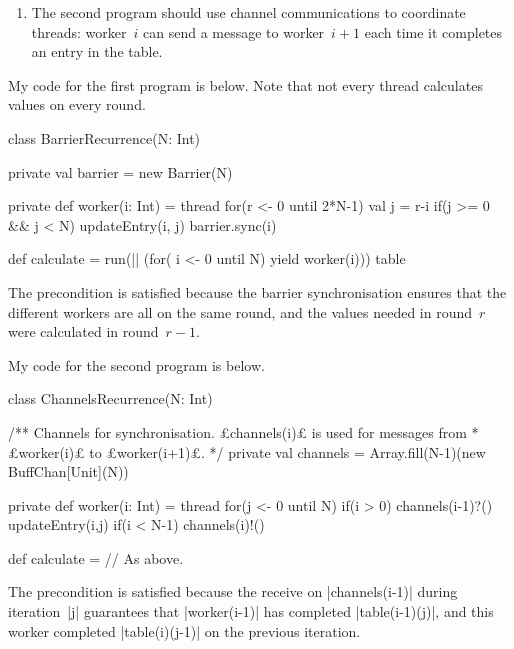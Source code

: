 \begin{question}
\begin{enumerate}
\item The second program should use channel communications to coordinate
  threads: worker~$i$ can send a message to worker~$i+1$ each time it
  completes an entry in the table.
\end{enumerate}
\end{question}


\begin{answerI}
My code for the first program is below.  Note that not every thread calculates
values on every round.
%
\begin{scala}
class BarrierRecurrence(N: Int){
  private val barrier = new Barrier(N)

  private def worker(i: Int) = thread{
    for(r <- 0 until 2*N-1){
      val j = r-i
      if(j >= 0 && j < N) updateEntry(i, j)
      barrier.sync(i)
    }
  }

  def calculate = {
    run(|| (for( i <- 0 until N) yield worker(i)))
    table
  }
}
\end{scala}
The precondition is satisfied because the barrier synchronisation ensures that
the different workers are all on the same round, and the values needed in
round~$r$ were calculated in round~$r-1$.

My code for the second program is below.
%
\begin{scala}
class ChannelsRecurrence(N: Int){
  /** Channels for synchronisation.  £channels(i)£ is used for messages from
    * £worker(i)£ to £worker(i+1)£. */
  private val channels = Array.fill(N-1)(new BuffChan[Unit](N))

  private def worker(i: Int) = thread{
    for(j <- 0 until N){
      if(i > 0) channels(i-1)?()
      updateEntry(i,j)
      if(i < N-1) channels(i)!()
    }
  }

  def calculate = // As above.
}
\end{scala}
%
The precondition is satisfied because the receive on |channels(i-1)| during
iteration~|j| guarantees that |worker(i-1)| has completed |table(i-1)(j)|, and
this worker completed |table(i)(j-1)| on the previous iteration.
\end{answerI}

